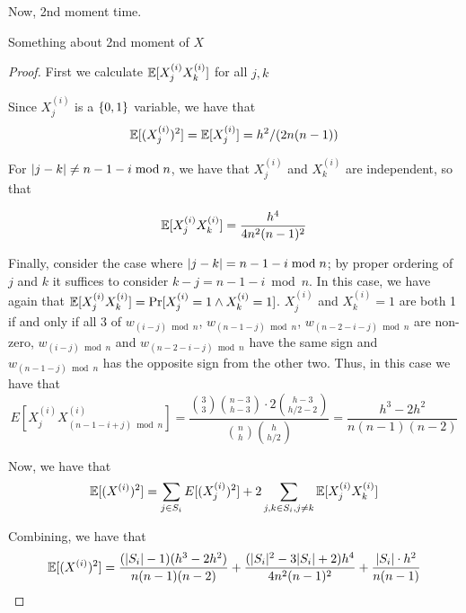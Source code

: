 Now, 2nd moment time. 

\begin{lemma}
Something about 2nd moment of $X$
\end{lemma}

\begin{proof}
First we calculate $\operatorname*{\mathbb{E}}[X^{(i)}_jX^{(i)}_k]$ for all $j,k$


Since $X^{(i)}_j$ is a $\{0,1\}$ variable, we have that
\[\operatorname*{\mathbb{E}}[(X^{(i)}_j)^2]=\operatorname*{\mathbb{E}}[X^{(i)}_j]=h^2/(2n(n-1))\]

For $\lvert j - k\rvert \neq n - 1 - i \bmod{n}$, we have that $X^{(i)}_j$
and $X^{(i)}_k$ are independent, so that 

\[\operatorname*{\mathbb{E}}[X^{(i)}_jX^{(i)}_k]=\frac{h^4}{4n^2(n-1)^2}\]

Finally, consider the case where $\lvert j-k\rvert = n - 1 - i \bmod{n}$; by
proper ordering of $j$ and $k$ it suffices to consider
$k-j=n-1-i\bmod{n}$. In this case, we have again that 
$\operatorname*{\mathbb{E}}[X^{(i)}_jX^{(i)}_k]=\Pr[X^{(i)}_j=1 \wedge
X^{(i)}_k=1]$. $X^{(i)}_j$ and $X^{(i)}_k=1$ are both 1 if and only if
all 3 of $w_{(i-j) \bmod{n}}$, $w_{(n-1-j) \bmod{n}}$, $w_{(n-2-i-j)
  \bmod{n}}$ are non-zero, $w_{(i-j) \bmod{n}}$ and  $w_{(n-2-i-j)
  \bmod{n}}$ have the same sign and $w_{(n-1-j) \bmod{n}}$ has the
  opposite sign from the other two. Thus, in this case we have that 
\[E[X^{(i)}_jX^{(i)}_{(n-1-i+j)\bmod{n}}]=\frac{\binom{3}{3}\binom{n-3}{h-3}\cdot
  2\binom{h-3}{h/2-2}}{\binom{n}{h}\binom{h}{h/2}}=\frac{h^3-2h^2}{n(n-1)(n-2)}\]


Now, we have that 
\[\operatorname*{\mathbb{E}}[(X^{(i)})^2]=\sum_{j \in S_i}E[(X^{(i)}_j)^2] + 2\sum_{j,k \in
    S_i, j\neq k}\operatorname*{\mathbb{E}}[X^{(i)}_jX^{(i)}_k]\]

Combining, we have that 
\[\operatorname*{\mathbb{E}}[(X^{(i)})^2]=\frac{(\lvert S_i\rvert-1)(h^3-2h^2)}{n(n-1)(n-2)}+\frac{(\lvert S_i\rvert^2-3\lvert S_i\rvert+2)h^4}{4n^2(n-1)^2}+\frac{\lvert S_i\rvert\cdot h^2}{n(n-1)}\]
\end{proof}




